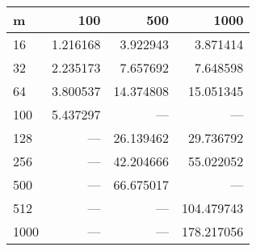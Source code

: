 \begin{tabular}{lrrr}
\toprule
{m} &      100  &       500  &        1000 \\
\midrule
16   &  1.216168 &   3.922943 &    3.871414 \\
32   &  2.235173 &   7.657692 &    7.648598 \\
64   &  3.800537 &  14.374808 &   15.051345 \\
100  &  5.437297 &        --- &         --- \\
128  &       --- &  26.139462 &   29.736792 \\
256  &       --- &  42.204666 &   55.022052 \\
500  &       --- &  66.675017 &         --- \\
512  &       --- &        --- &  104.479743 \\
1000 &       --- &        --- &  178.217056 \\
\bottomrule
\end{tabular}

